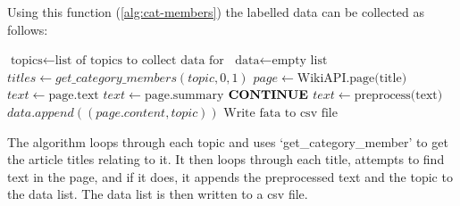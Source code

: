 \newpage
Using this function (\cref{alg:cat-members}) the labelled data can be collected as follows:
\begin{algorithm}
    \caption{$\text{Algorithm to Retrieve Wikipedia Data}$}\label{alg:wiki-data}
    \begin{algorithmic}
        \STATE $\text{topics} \gets \text{list of topics to collect data for}$
        \STATE $\text{data} \gets \text{empty list}$
            \STATE $titles \gets get\_category\_members(topic, 0, 1)$
                \STATE $page \gets \text{WikiAPI.page(title)}$
                \STATE $text \gets \text{page.text}$
                    \STATE $text \gets \text{page.summary}$
                \ENDIF
                    \STATE $\text{\textbf{CONTINUE}}$
                \ENDIF
                \STATE $text \gets \text{preprocess(text)}$
                \STATE $data.append((page.content, topic))$
            \ENDFOR
        \ENDFOR
        \STATE $\text{Write fata to csv file}$
    \end{algorithmic}
\end{algorithm}
\newpage
The algorithm loops through each topic and uses `get\_category\_member' to get the article titles relating to it. It then loops through each title, attempts to find text in the page,
and if it does, it appends the preprocessed text and the topic to the data list. The data list is then written to a csv file.
